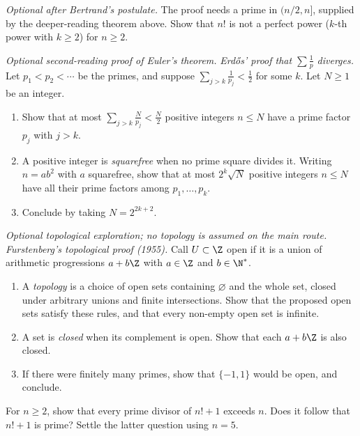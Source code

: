 \begin{exercise}[$\star\star$]\label{ex:factorial}
\emph{Optional after Bertrand's postulate.} The proof needs a
prime in $(n/2,n]$, supplied by the deeper-reading theorem above.
Show that $n!$ is not a perfect power ($k$-th power with $k\ge2$) for $n\ge2$.
\end{exercise}

\begin{exercise}[$\star\star\star$]\label{ex:erdosdiv}
\emph{Optional second-reading proof of Euler's theorem.}
\emph{Erd\H{o}s' proof that $\sum\frac1p$ diverges.} Let $p_1<p_2<\cdots$ be the primes, and suppose $\sum_{j>k}\frac1{p_j}<\frac12$ for some $k$. Let $N\ge1$ be an integer.
\begin{enumerate}[label=(\alph*)]
\item Show that at most $\sum_{j>k}\frac N{p_j}<\frac N2$ positive integers $n\le N$ have a prime factor $p_j$ with $j>k$.
\item A positive integer is \emph{squarefree} when no prime square divides it. Writing $n=ab^2$ with $a$ squarefree, show that at most $2^k\sqrt N$ positive integers $n\le N$ have all their prime factors among $p_1,\dots,p_k$.
\item Conclude by taking $N=2^{2k+2}$.
\end{enumerate}
\end{exercise}

\begin{exercise}[$\star\star\star$]\label{ex:furstenberg}
\emph{Optional topological exploration; no topology is assumed on the main route.}
\emph{Furstenberg's topological proof (1955).} Call $U\subset\Z$ open if it is a union of arithmetic progressions $a+b\Z$ with $a\in\Z$ and $b\in\N^*$.
\begin{enumerate}[label=(\alph*)]
\item A \emph{topology} is a choice of open sets containing $\varnothing$ and the whole set, closed under arbitrary unions and finite intersections. Show that the proposed open sets satisfy these rules, and that every non-empty open set is infinite.
\item A set is \emph{closed} when its complement is open. Show that each $a+b\Z$ is also closed.
\item If there were finitely many primes, show that $\{-1,1\}$ would be open, and conclude.
\end{enumerate}
\end{exercise}

\begin{exercise}[$\star$]\label{ex:t1-factorial-new-prime}
For $n\ge2$, show that every prime divisor of $n!+1$ exceeds $n$. Does it follow that $n!+1$ is prime? Settle the latter question using $n=5$.
\end{exercise}

